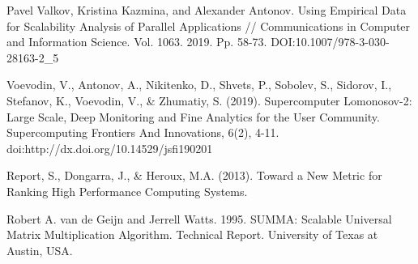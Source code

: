 \begin{thebibliography}{}
			Pavel Valkov, Kristina Kazmina, and Alexander Antonov. Using Empirical Data for Scalability Analysis of Parallel Applications // Communications in Computer and Information Science. Vol. 1063. 2019. Pp. 58-73. DOI:10.1007/978-3-030-28163-2\_5

			Voevodin, V., Antonov, A., Nikitenko, D., Shvets, P., Sobolev, S., Sidorov, I., Stefanov, K., Voevodin, V., \& Zhumatiy, S. (2019). Supercomputer Lomonosov-2: Large Scale, Deep Monitoring and Fine Analytics for the User Community. Supercomputing Frontiers And Innovations, 6(2), 4-11. doi:http://dx.doi.org/10.14529/jsfi190201

			Report, S., Dongarra, J., \& Heroux, M.A. (2013). Toward a New Metric for Ranking High Performance Computing Systems.

			Robert A. van de Geijn and Jerrell Watts. 1995. SUMMA: Scalable Universal Matrix Multiplication Algorithm. Technical Report. University of Texas at Austin, USA.		 
		
		\end{thebibliography}
	\endgroup